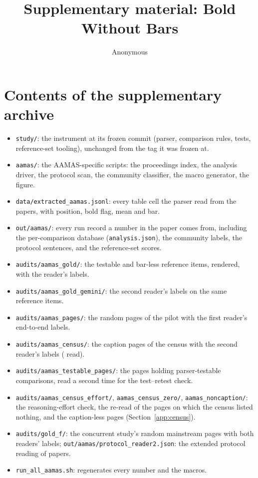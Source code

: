 \documentclass[sigconf,anonymous]{aamas}
\title{Supplementary material: Bold Without Bars}
\author{Anonymous}
\affiliation{\institution{Anonymous}\city{}\country{}}
\begin{document}
\maketitle

\section{Contents of the supplementary archive}
\begin{itemize}
\item \texttt{study/}: the instrument at its frozen commit (parser, comparison
  rules, tests, reference-set tooling), unchanged from the tag it was frozen at.
\item \texttt{aamas/}: the AAMAS-specific scripts: the proceedings index, the
  analysis driver, the protocol scan, the community classifier, the macro
  generator, the figure.
\item \texttt{data/extracted\_aamas.jsonl}: every table cell the parser read
  from the \nAPapers{} papers, with position, bold flag, mean and bar.
\item \texttt{out/aamas/}: every run record a number in the paper comes from,
  including the per-comparison database (\texttt{analysis.json}), the
  community labels, the protocol sentences, and the reference-set scores.
\item \texttt{audits/aamas\_gold/}: the \nGTestableN{} testable and
  \nGNoBarN{} bar-less reference items, rendered, with the reader's labels.
\item \texttt{audits/aamas\_gold\_gemini/}: the second reader's labels on the
  same reference items.
\item \texttt{audits/aamas\_pages/}: the \nPagesRead{} random pages of the
  pilot with the first reader's end-to-end labels.
\item \texttt{audits/aamas\_census/}: the \nCzPagesDrawn{} caption pages of
  the census with the second reader's labels (\nCzPagesRead{} read).
\item \texttt{audits/aamas\_testable\_pages/}: the \nTpPages{} pages holding
  parser-testable comparisons, read a second time for the test--retest check.
\item \texttt{audits/aamas\_census\_effort/}, \texttt{aamas\_census\_zero/},
  \texttt{aamas\_noncaption/}: the reasoning-effort check, the re-read of
  the pages on which the census listed nothing, and the caption-less pages
  (Section~\ref{app:census}).
\item \texttt{audits/gold\_f/}: the concurrent study's \nScPages{} random
  mainstream pages with both readers' labels; \texttt{out/aamas/protocol\_reader2.json}:
  the extended protocol reading of \nPtwoPapers{} papers.
\item \texttt{run\_all\_aamas.sh}: regenerates every number and the macros.
\end{itemize}
\end{document}
